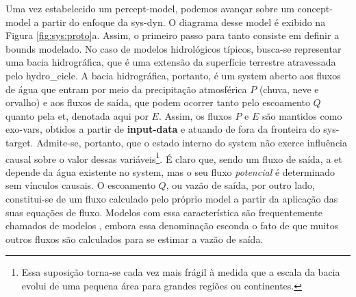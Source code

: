 \documentclass[./main.tex]{subfiles}
\begin{document}
\par Uma vez estabelecido um \gls{percept-model}, podemos avançar sobre um \gls{concept-model} a partir do enfoque da \gls{sys-dyn}. O diagrama desse \gls{model} é exibido na Figura \ref{fig:sys:proto}a. Assim, o primeiro passo para tanto consiste em definir a \gls{bounds} modelado. No caso de modelos hidrológicos típicos, busca-se representar uma bacia hidrográfica, que é uma extensão da superfície terrestre atravessada pelo \gls{hydro_cicle}. A bacia hidrográfica, portanto, é um \gls{system} aberto aos fluxos de água que entram por meio da precipitação atmosférica $P$ (chuva, neve e orvalho) e aos fluxos de saída, que podem ocorrer tanto pelo escoamento $Q$ quanto pela \acrlong{et}, denotada aqui por $E$. Assim, os fluxos $P$ e $E$ são mantidos como \gls{exo-vars}, obtidos a partir de \textbf{\gls{input-data}} e atuando de fora da fronteira do \gls{sys-target}. Admite-se, portanto, que o estado interno do \gls{system} não exerce influência causal sobre o valor dessas variáveis\footnote{Essa suposição torna-se cada vez mais frágil à medida que a escala da bacia evolui de uma pequena área para grandes regiões ou continentes.}. É claro que, sendo um fluxo de saída, a \acrlong{et} depende da água existente no \gls{system}, mas o seu fluxo \textit{potencial} é determinado sem vínculos causais. O escoamento $Q$, ou vazão de saída, por outro lado, constitui-se de um fluxo calculado pelo próprio \gls{model} a partir da aplicação das suas equações de fluxo. Modelos com essa característica são frequentemente chamados de modelos , embora essa denominação esconda o fato de que muitos outros fluxos são calculados para se estimar a vazão de saída.
\end{document}
